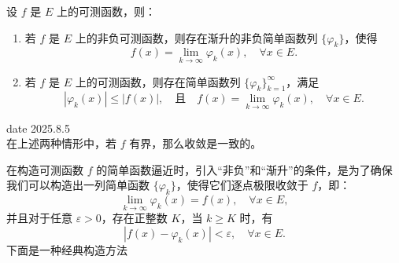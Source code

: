 \documentclass[lang=cn,10pt]{elegantbook}
\begin{document}
\begin{theorem}[可测函数是简单函数的极限]
设 $f$ 是 $E$ 上的可测函数，则：

\begin{enumerate}[(1)]
    \item 若 $f$ 是 $E$ 上的非负可测函数，则存在渐升的非负简单函数列 $\{\varphi_k\}$，使得
    \[
    f(x) = \lim_{k \to \infty} \varphi_k(x), \quad \forall x \in E.
    \]

    \item 若 $f$ 是 $E$ 上的可测函数，则存在简单函数列 $\{\varphi_k\}_{k=1}^\infty$，满足
    \[
    |\varphi_k(x)| \leq |f(x)|, \quad \text{且} \quad f(x) = \lim_{k \to \infty} \varphi_k(x), \quad \forall x \in E.
    \]
\end{enumerate}
date 2025.8.5\\
在上述两种情形中，若 $f$ 有界，那么收敛是一致的。
\end{theorem}
在构造可测函数 $f$ 的简单函数逼近时，引入“非负”和“渐升”的条件，是为了确保我们可以构造出一列简单函数 $\{\varphi_k\}$，使得它们逐点极限收敛于 $f$，即：
\[
\lim_{k \to \infty} \varphi_k(x) = f(x), \quad \forall x \in E,
\]
并且对于任意 $\varepsilon > 0$，存在正整数 $K$，当 $k \geq K$ 时，有
\[
|f(x) - \varphi_k(x)| < \varepsilon, \quad \forall x \in E.
\]
下面是一种经典构造方法
\end{document}
